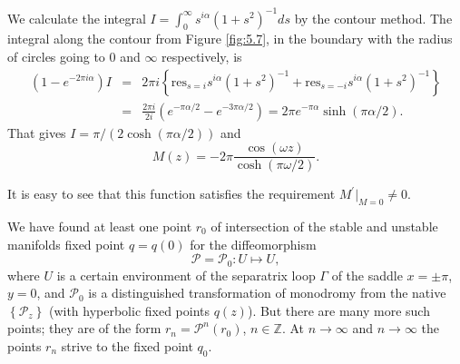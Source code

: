 We calculate the integral $I=\int_{0}^{\infty} s^{i\alpha} (1+s^{2})^{-1}ds$ by the contour method. The integral along the contour from Figure \ref{fig:5.7}, in the boundary with the radius of circles going to $0$ and $\infty $ respectively, is
$$
\begin{array}{lll}
(1-e^{-2\pi i\alpha })I &=&2\pi i\left\{ \textrm{res}_{s=i}s^{i\alpha
}(1+s^{2})^{-1}+\textrm{res}_{s=-i}s^{i\alpha }(1+s^{2})^{-1}\right\} \\
&=&\frac{2\pi i}{2i}\left( e^{-\pi \alpha /2}-e^{-3\pi \alpha /2}\right) = 2\pi e^{-\pi \alpha }\sinh \left( \pi \alpha /2\right).
\end{array}
$$
That gives $I=\pi /(2\cosh (\pi \alpha /2))$ and
$$
M(z)=-2\pi \frac{\cos (\omega z)}{\cosh (\pi \omega/2)}.
$$

It is easy to see that this function satisfies the requirement $M^{\prime}|_{M=0} \not = 0$.

We have found at least one point $r_{0}$ of intersection of the stable and unstable manifolds fixed point $q=q(0)$ for the diffeomorphism
$$
\mathcal{P}=\mathcal{P}_{0}:U\longmapsto U,
$$
where $U$ is a certain environment of the separatrix loop $\Gamma$ of the saddle $x=\pm \pi$, $y=0$, and $\mathcal{P}_{0}$ is a distinguished transformation of monodromy from the native $\left\{ \mathcal{P}_{z} \right\} $ (with hyperbolic fixed points $q(z)$). But there are many more such points; they are of the form $r_{n} = \mathcal{P}^{n}(r_{0})$,  $n\in \mathbb{Z}$. At $n\to \infty $ and $n\to \infty $ the points $r_{n}$ strive to the fixed point $q_{0}$.

